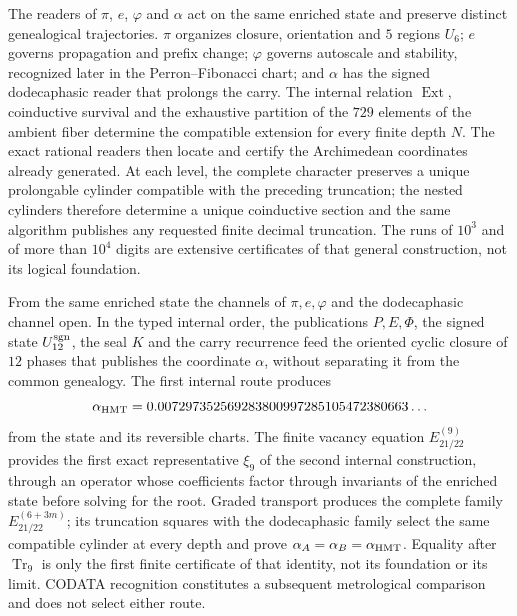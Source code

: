 The readers of \(\pi\), \(e\), \(\varphi\) and \(\alpha\) act on the same
enriched state and preserve distinct genealogical trajectories.
\(\pi\) organizes closure, orientation and \(5\) regions \(U_6\); \(e\)
governs propagation and prefix change; \(\varphi\) governs autoscale and
stability, recognized later in the Perron--Fibonacci chart; and \(\alpha\)
has the signed dodecaphasic reader that prolongs the carry. The internal
relation \(\operatorname{Ext}\), coinductive survival and the exhaustive
partition of the \(729\) elements of the ambient fiber determine the
compatible extension for every finite depth \(N\). The exact rational
readers then locate and certify the Archimedean
coordinates already generated. At each level, the complete character preserves a
unique prolongable cylinder compatible with the preceding truncation; the
nested cylinders therefore determine a unique
coinductive section and the same algorithm publishes any requested finite decimal
truncation. The runs of \(10^3\) and of more than \(10^4\) digits are
extensive certificates of that general construction, not its logical foundation.

From the same enriched state the channels of
\(\pi,e,\varphi\) and the dodecaphasic channel open. In the typed internal order, the
publications \(P,E,\Phi\), the signed state \(U_{12}^{\rm sgn}\), the seal
\(K\) and the carry recurrence feed the oriented cyclic closure of
\(12\) phases that publishes the coordinate \(\alpha\), without separating it from the
common genealogy. The first internal route produces
\[
 \alpha_{\rm HMT}
 =0.007297352569283800997285105472380663\ldots
\]
from the state and its reversible charts. The finite vacancy equation
\(E_{21/22}^{(9)}\) provides the first exact representative \(\xi_9\) of
the second internal construction, through an operator whose coefficients
factor through invariants of the enriched state before solving for the root.
Graded transport produces the complete family
\(E_{21/22}^{(6+3m)}\); its truncation squares with the dodecaphasic
family select the same compatible cylinder at every depth and
prove \(\alpha_A=\alpha_B=\alpha_{\rm HMT}\). Equality after
\(\operatorname{Tr}_9\) is only the first finite certificate of that identity,
not its foundation or its limit. CODATA recognition constitutes a
subsequent metrological comparison and does not select either route.

